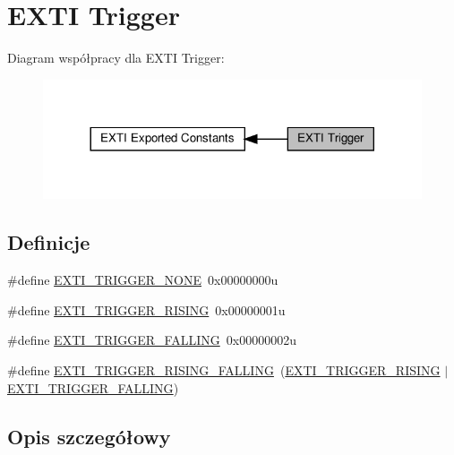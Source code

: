 \hypertarget{group___e_x_t_i___trigger}{}\section{E\+X\+TI Trigger}
\label{group___e_x_t_i___trigger}
Diagram współpracy dla E\+X\+TI Trigger\+:\nopagebreak
\begin{figure}[H]
\begin{center}
\leavevmode
\includegraphics[width=317pt]{group___e_x_t_i___trigger}
\end{center}
\end{figure}
\subsection*{Definicje}
\begin{DoxyCompactItemize}
\item 
\#define \hyperlink{group___e_x_t_i___trigger_gab0a4e8ed945992cb0cf071efe85748c8}{E\+X\+T\+I\+\_\+\+T\+R\+I\+G\+G\+E\+R\+\_\+\+N\+O\+NE}~0x00000000u
\item 
\#define \hyperlink{group___e_x_t_i___trigger_ga648bd5d6c2bebd85b5ea85f8af9a2ccc}{E\+X\+T\+I\+\_\+\+T\+R\+I\+G\+G\+E\+R\+\_\+\+R\+I\+S\+I\+NG}~0x00000001u
\item 
\#define \hyperlink{group___e_x_t_i___trigger_ga7461c33165994159edf79a095c227937}{E\+X\+T\+I\+\_\+\+T\+R\+I\+G\+G\+E\+R\+\_\+\+F\+A\+L\+L\+I\+NG}~0x00000002u
\item 
\#define \hyperlink{group___e_x_t_i___trigger_ga481cea6a2aafe107e5657b65887c81d5}{E\+X\+T\+I\+\_\+\+T\+R\+I\+G\+G\+E\+R\+\_\+\+R\+I\+S\+I\+N\+G\+\_\+\+F\+A\+L\+L\+I\+NG}~(\hyperlink{group___e_x_t_i___trigger_ga648bd5d6c2bebd85b5ea85f8af9a2ccc}{E\+X\+T\+I\+\_\+\+T\+R\+I\+G\+G\+E\+R\+\_\+\+R\+I\+S\+I\+NG} $\vert$ \hyperlink{group___e_x_t_i___trigger_ga7461c33165994159edf79a095c227937}{E\+X\+T\+I\+\_\+\+T\+R\+I\+G\+G\+E\+R\+\_\+\+F\+A\+L\+L\+I\+NG})
\end{DoxyCompactItemize}


\subsection{Opis szczegółowy}



